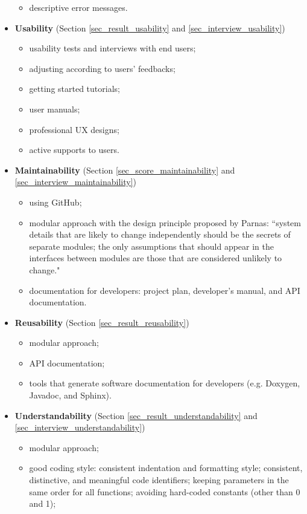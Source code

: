 \begin{itemize}
\begin{itemize}
    \item descriptive error messages.
\end{itemize}
\item \textbf{Usability} (Section \ref{sec_result_usability} and \ref{sec_interview_usability})
\begin{itemize}
    \item usability tests and interviews with end users;
    \item adjusting according to users’ feedbacks;
    \item getting started tutorials;
    \item user manuals;
    \item professional UX designs;
    \item active supports to users.
\end{itemize}
\item \textbf{Maintainability} (Section \ref{sec_score_maintainability} and \ref{sec_interview_maintainability})
\begin{itemize}
    \item using GitHub;
    \item modular approach with the design principle proposed by Parnas: ``system details that are likely to change independently should be the secrets of separate modules; the only assumptions that should appear in the interfaces between modules are those that are considered unlikely to change." \cite{ParnasEtAl2000}
    \item documentation for developers: project plan, developer’s manual, and API documentation.
\end{itemize}
\item \textbf{Reusability} (Section \ref{sec_result_reusability})
\begin{itemize}
    \item modular approach;
    \item API documentation;
    \item tools that generate software documentation for developers (e.g. Doxygen, Javadoc, and Sphinx).
\end{itemize}
\item \textbf{Understandability} (Section \ref{sec_result_understandability} and \ref{sec_interview_understandability})
\begin{itemize}
    \item modular approach;
    \item good coding style: consistent indentation and formatting style; consistent, distinctive, and meaningful code identifiers; keeping parameters in the same order for all functions; avoiding hard-coded constants (other than 0 and 1);

\end{itemize}
\end{itemize}
